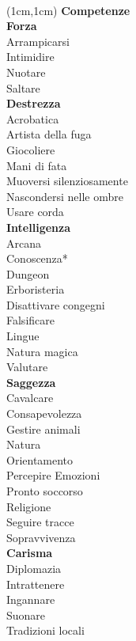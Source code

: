 \documentclass[a4paper,12 pt,openany]{book}
\begin{document}
	~\newpage
	
		\begin{textblock*}{4cm}(1cm,1cm) %
		{\textbf{Competenze}\\
			\footnotesize 
			\textbf{Forza}\\
			Arrampicarsi\\
			Intimidire\\
			Nuotare\\
			Saltare	\\
			\textbf{Destrezza}\\
			Acrobatica\\
			Artista della fuga\\
			Giocoliere\\
			Mani di fata\\
			Muoversi silenziosamente\\
			Nascondersi nelle ombre\\
			Usare corda	\\
			\textbf{Intelligenza}\\
			Arcana\\
			Conoscenza*\\
			Dungeon\\
			Erboristeria\\
			Disattivare congegni\\
			Falsificare\\
			Lingue\\
			Natura magica\\
			Valutare\\
			\textbf{Saggezza}\\
			Cavalcare\\
			Consapevolezza\\
			Gestire animali\\
			Natura\\
			Orientamento\\
			Percepire Emozioni\\
			Pronto soccorso\\
			Religione\\
			Seguire tracce\\
			Sopravvivenza\\
			\textbf{Carisma}\\
			Diplomazia\\
			Intrattenere\\
			Ingannare\\
			Suonare\\
			Tradizioni locali
		}
		
	\end{textblock*}	
\end{document}
